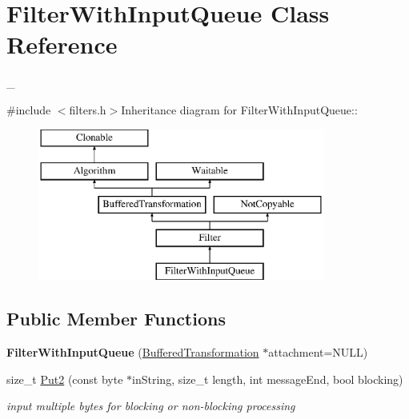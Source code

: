 \hypertarget{class_filter_with_input_queue}{
\section{FilterWithInputQueue Class Reference}
\label{class_filter_with_input_queue}
}


\_\-  


{\ttfamily \#include $<$filters.h$>$}Inheritance diagram for FilterWithInputQueue::\begin{figure}[H]
\begin{center}
\leavevmode
\includegraphics[height=5cm]{class_filter_with_input_queue}
\end{center}
\end{figure}
\subsection*{Public Member Functions}
\begin{DoxyCompactItemize}
\item 
\hypertarget{class_filter_with_input_queue_a4cbafb997e9f2a310ed490eea49fb1ab}{
{\bfseries FilterWithInputQueue} (\hyperlink{class_buffered_transformation}{BufferedTransformation} $\ast$attachment=NULL)}
\label{class_filter_with_input_queue_a4cbafb997e9f2a310ed490eea49fb1ab}

\item 
size\_\-t \hyperlink{class_filter_with_input_queue_a91c11ca74a8ba2350da6ad6ca8d721a0}{Put2} (const byte $\ast$inString, size\_\-t length, int messageEnd, bool blocking)
\begin{DoxyCompactList}\small\item\em input multiple bytes for blocking or non-\/blocking processing \item\end{DoxyCompactList}\end{DoxyCompactItemize}
